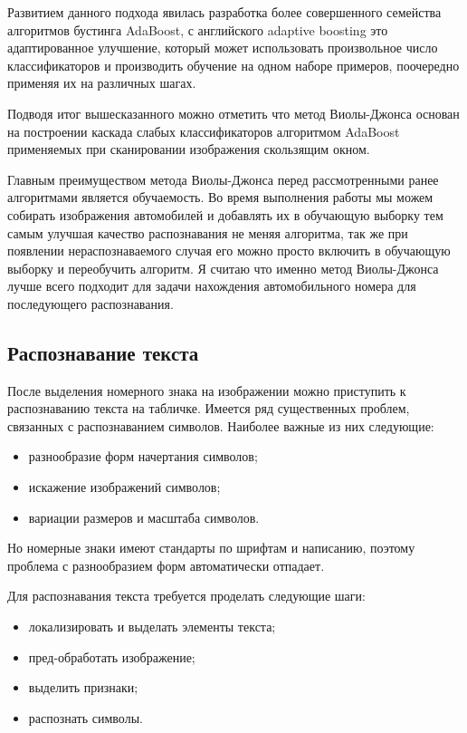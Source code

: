 Развитием данного подхода явилась разработка более совершенного семейства алгоритмов бустинга AdaBoost, с английского adaptive boosting это адаптированное улучшение, который может использовать произвольное число классификаторов и производить обучение на одном наборе примеров, поочередно применяя их на различных шагах.

Подводя итог вышесказанного можно отметить что метод Виолы-Джонса основан на построении каскада слабых классификаторов алгоритмом AdaBoost применяемых при сканировании изображения скользящим окном.

Главным преимуществом метода Виолы-Джонса перед рассмотренными ранее алгоритмами является обучаемость. Во время выполнения работы мы можем собирать изображения автомобилей и добавлять их в обучающую выборку тем самым улучшая качество распознавания не меняя алгоритма, так же при появлении нераспознаваемого случая его можно просто включить в обучающую выборку и переобучить алгоритм. Я считаю что именно метод Виолы-Джонса лучше всего подходит для задачи нахождения автомобильного номера для последующего распознавания.

\subsection{Распознавание текста}
\label{sub:domain:recognition}

После выделения номерного знака на изображении можно приступить к распознаванию текста на табличке. 
Имеется ряд существенных проблем, связанных с распознаванием символов. Наиболее важные из них следующие:
\begin{itemize}
  \item разнообразие форм начертания символов;
  \item искажение изображений символов;
  \item вариации размеров и масштаба символов.
\end{itemize}

Но номерные знаки имеют стандарты по шрифтам и написанию, поэтому проблема с разнообразием форм автоматически отпадает.

Для распознавания текста требуется проделать следующие шаги:
\begin{itemize}
  \item локализировать и выделать элементы текста;
  \item пред-обработать изображение;
  \item выделить признаки;
  \item распознать символы.
\end{itemize}

